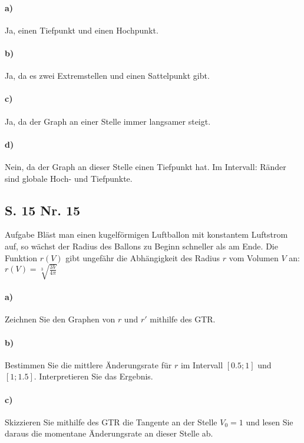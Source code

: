 \documentclass[arbeitsmappe.tex]{subfiles}
\begin{document}
    \paragraph{a) } Ja, einen Tiefpunkt und einen Hochpunkt.

    \paragraph{b) } Ja, da es zwei Extremstellen und einen Sattelpunkt gibt.

    \paragraph{c) } Ja, da der Graph an einer Stelle immer langsamer steigt.

    \paragraph{d) } Nein, da der Graph an dieser Stelle einen Tiefpunkt hat.
    Im Intervall: Ränder sind globale Hoch- und Tiefpunkte.
    \newpage

    \subsection{S. 15 Nr. 15}
    \begin{rblock}{Aufgabe}
        Bläst man einen kugelförmigen Luftballon mit konstantem Luftstrom auf, so wächst der Radius des Ballons zu Beginn schneller als am Ende.
        Die Funktion $r(V)$ gibt ungefähr die Abhängigkeit des Radius $r$ vom Volumen $V$ an: $r(V) = \sqrt[3]{\frac{3V}{4\pi}}$

        \paragraph{a)} Zeichnen Sie den Graphen von $r$ und $r'$ mithilfe des GTR.

        \paragraph{b)} Bestimmen Sie die mittlere Änderungsrate für $r$ im Intervall $[0.5;1]$ und $[1;1.5]$.
        Interpretieren Sie das Ergebnis.

        \paragraph{c)} Skizzieren Sie mithilfe des GTR die Tangente an der Stelle $V_0 = 1$ und lesen Sie daraus die momentane Änderungsrate an dieser Stelle ab.
    \end{rblock}
\end{document}
